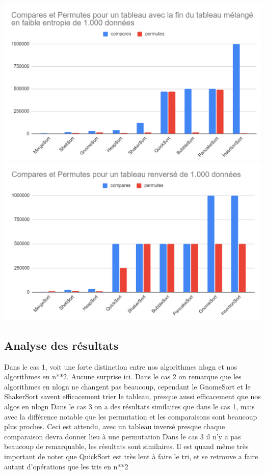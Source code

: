 \documentclass{article}
\begin{document}
\newline
\includegraphics[scale=0.4]{Annexes/GrapheComparePermuteAllShuffleTail.PNG}
\newline
\includegraphics[scale=0.4]{Annexes/GrapheComparePermuteAllReverseTab.PNG}

\subsection{Analyse des résultats}
Dans le cas 1, voit une forte distinction entre nos algorithmes nlogn et nos algorithmes en n**2. Aucune surprise ici.
\newline
\newline
Dans le cas 2 on remarque que les algorithmes en nlogn ne changent pas beaucoup, cependant le GnomeSort et le ShakerSort savent efficacement trier le tableau, presque aussi efficacement que nos algos en nlogn
\newline
\newline
Dans le cas 3 on a des résultats similaires que dans le cas 1, mais avec la différence notable que les permutation et les comparaisons sont beaucoup plus proches. Ceci est attendu, avec un tableau inversé presque chaque comparaison devra donner lieu à une permutation
\newline
\newline
Dans le cas 3 il n'y a pas beaucoup de remarquable, les résultats sont similaires. Il est quand même très important de noter que QuickSort est très lent à faire le tri, et se retrouve a faire autant d'opérations que les tris en n**2
\end{document}
